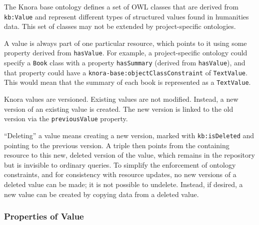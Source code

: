 \documentclass[12pt, a4paper]{article}
\begin{document}
\label{subsec:values}

The Knora base ontology defines a set of OWL classes that are derived from \texttt{kb:Value} and represent different types of structured values found in humanities data. This set of classes may not be extended by project-specific ontologies.

A value is always part of one particular resource, which points to it using some property derived from \texttt{hasValue}. For example, a project-specific ontology could specify a \texttt{Book} class with a property \texttt{hasSummary} (derived from \texttt{hasValue}), and that property could have a \texttt{knora-base:object\-Class\-Constraint} of \texttt{TextValue}. This would mean that the summary of each book is represented as a \texttt{TextValue}.

Knora values are versioned. Existing values are not modified. Instead, a new version of an existing value is created. The new version is linked to the old version via the \texttt{previousValue} property.

\enquote{Deleting} a value means creating a new version, marked with \texttt{kb:is\-Deleted} and pointing to the previous version. A triple then points from the containing resource to this new, deleted version of the value, which remains in the repository but is invisible to ordinary queries. To simplify the enforcement of ontology constraints, and for consistency with resource updates, no new versions of a deleted value can be made; it is not possible to undelete. Instead, if desired, a new value can be created by copying data from a deleted value.

\subsubsection{Properties of Value}
\end{document}
